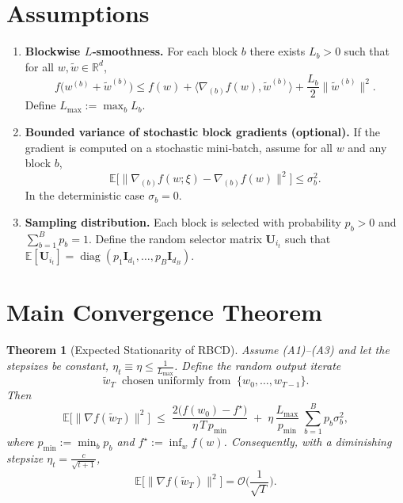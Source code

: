 \documentclass{article}
\newtheorem{theorem}{Theorem}
\newcommand{\E}{\mathbb{E}}
\newcommand{\R}{\mathbb{R}}
\begin{document}
\section*{Assumptions}
\begin{enumerate}[label=\textbf{A\arabic*}:, leftmargin=*]
\item \textbf{Blockwise $L$‑smoothness.}  
For each block $b$ there exists $L_b>0$ such that for all $w,\tilde w\in\R^{d}$,
\[
f\big(w^{(b)}\!\!+\!\!\tilde w^{(b)}\big)
\le f(w)+\langle\nabla_{(b)}f(w),\tilde w^{(b)}\rangle
+\frac{L_b}{2}\|\tilde w^{(b)}\|^2 .
\tag{A1}
\]
Define $L_{\max}:=\max_{b}L_b$.

\item \textbf{Bounded variance of stochastic block gradients (optional).}  
If the gradient is computed on a stochastic mini‑batch,
assume for all $w$ and any block $b$,
\[
\E\big[\|\nabla_{(b)} f(w;\xi)-\nabla_{(b)}f(w)\|^2\big]\le\sigma_b^2 .
\tag{A2}
\]
In the deterministic case $\sigma_b=0$.

\item \textbf{Sampling distribution.}  
Each block is selected with probability $p_b>0$ and $\sum_{b=1}^{B}p_b=1$.
Define the random selector matrix $\mathbf{U}_{i_t}$ such that
$\E[\mathbf{U}_{i_t}]=\operatorname{diag}(p_1\mathbf{I}_{d_1},\dots,
p_B\mathbf{I}_{d_B})$.
\end{enumerate}

\section*{Main Convergence Theorem}
\begin{theorem}[Expected Stationarity of RBCD]\label{thm:main}
Assume (A1)–(A3) and let the stepsizes be constant,
$\eta_t\equiv \eta\le \frac{1}{L_{\max}}$.
Define the random output iterate 
\[
\tilde w_T\;\;\text{chosen uniformly from}\;\;\{w_0,\dots ,w_{T-1}\}.
\]
Then
\[
\E\big[\|\nabla f(\tilde w_T)\|^2\big]
\;\le\;
\frac{2\big(f(w_0)-f^\star\big)}{\eta\,T\,p_{\min}}
\;+\;
\eta\,\frac{L_{\max}}{p_{\min}}\;\sum_{b=1}^{B}p_b\sigma_b^2,
\tag{1}
\]
where $p_{\min}:=\min_{b}p_b$ and $f^\star:=\inf_{w}f(w)$.
Consequently, with a diminishing stepsize $\eta_t=\frac{c}{\sqrt{t+1}}$,
\[
\E\big[\|\nabla f(\tilde w_T)\|^2\big]=\mathcal O\!\Big(\frac{1}{\sqrt{T}}\Big).
\]
\end{theorem}

\end{document}
